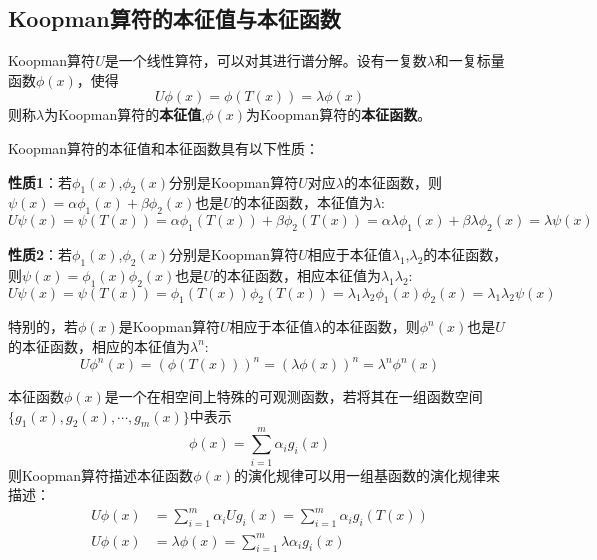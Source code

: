 \subsection{Koopman算符的本征值与本征函数}
Koopman算符$U$是一个线性算符，可以对其进行谱分解。设有一复数$\lambda$和一复标量函数$\phi(x)$，使得
\begin{equation}
    U\phi(x)=\phi(T(x))=\lambda\phi(x)
\end{equation}
则称$\lambda$为Koopman算符的\textbf{本征值},$\phi(x)$为Koopman算符的\textbf{本征函数}。

Koopman算符的本征值和本征函数具有以下性质：

\textbf{性质1}：若$\phi_1(x)$,$\phi_2(x)$分别是Koopman算符$U$对应$\lambda$的本征函数，则$\psi(x)=\alpha\phi_1(x)+\beta\phi_2(x)$也是$U$的本征函数，本征值为$\lambda$:
\begin{equation}
    U\psi(x)=\psi(T(x))=\alpha\phi_1(T(x))+\beta\phi_2(T(x))=\alpha\lambda\phi_1(x)+\beta
    \lambda\phi_2(x)=\lambda\psi(x)
\end{equation}

\textbf{性质2}：若$\phi_1(x)$,$\phi_2(x)$分别是Koopman算符$U$相应于本征值$\lambda_1$,$\lambda_2$的本征函数，则$\psi(x)=\phi_1(x)\phi_2(x)$也是$U$的本征函数，相应本征值为$\lambda_1\lambda_2$: 
\begin{equation}
U\psi(x)=\psi(T(x))=\phi_1(T(x))\phi_2(T(x))=\lambda_1\lambda_2\phi_1(x)\phi_2(x)=\lambda_1\lambda_2\psi(x)
\end{equation}

特别的，若$\phi(x)$是Koopman算符$U$相应于本征值$\lambda$的本征函数，则$\phi^n(x)$也是$U$的本征函数，相应的本征值为$\lambda^n$:
\begin{equation}
    U\phi^n(x)=(\phi(T(x)))^n=(\lambda\phi(x))^n=\lambda^n\phi^n(x)
\end{equation}

本征函数$\phi(x)$是一个在相空间上特殊的可观测函数，若将其在一组函数空间$\{g_1(x),g_2(x),\cdots,g_m(x)\}$中表示
\begin{equation}
    \phi(x)=\sum_{i=1}^m\alpha_ig_i(x)
\end{equation}
则Koopman算符描述本征函数$\phi(x)$的演化规律可以用一组基函数的演化规律来描述：
\begin{equation}
    \begin{aligned}
        U\phi(x)&=\sum_{i=1}^m\alpha_iUg_i(x)=\sum_{i=1}^m\alpha_ig_i(T(x))\\
        U\phi(x)&=\lambda\phi(x)=\sum_{i=1}^m\lambda\alpha_ig_i(x)
    \end{aligned}
\end{equation}

